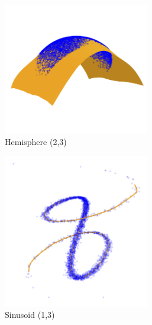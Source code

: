 \begin{figure}[h]
    \centering

    \begin{subfigure}[b]{0.32\textwidth}
        \centering
        \includegraphics[width=0.7\textwidth]{Outline/figures/score-based-riemannian-geometry/hemisphere.jpg}
        \caption{Hemisphere (2,3)}
    \end{subfigure}
    \hfill
    \begin{subfigure}[b]{0.32\textwidth}
        \centering
        \includegraphics[width=0.7\textwidth]{Outline/figures/score-based-riemannian-geometry/sinusoid_1_3.jpg}
        \caption{Sinusoid (1,3)}
    \end{subfigure}
    \hfill
    \begin{subfigure}[b]{0.32\textwidth}

\end{subfigure}
\end{figure}
